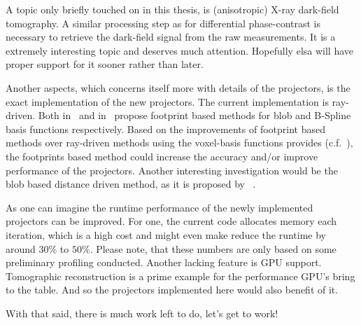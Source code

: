 A topic only briefly touched on in this thesis, is (anisotropic) X-ray dark-field tomography. A
similar processing step as for differential phase-contrast is necessary to retrieve the dark-field
signal from the raw measurements. It is a extremely interesting topic and deserves much attention.
Hopefully elsa will have proper support for it sooner rather than later.

Another aspects, which concerns itself more with details of the projectors, is the exact
implementation of the new projectors. The current implementation is ray-driven. Both
\citeauthor*{kohler_iterative_2011} in~\cite{kohler_iterative_2011} and
\citeauthor*{momey_spline_2015} in~\cite{momey_spline_2015} propose footprint based methods for blob
and B-Spline basis functions respectively. Based on the improvements of footprint based methods over
ray-driven methods using the voxel-basis functions provides (c.f.\ \cite{long_3d_2010}), the
footprints based method could increase the accuracy and/or improve performance of the projectors.
Another interesting investigation would be the blob based distance driven method, as it is proposed
by \citeauthor*{levakhina_distance-driven_2010}~\cite{levakhina_distance-driven_2010}.

As one can imagine the runtime performance of the newly implemented projectors can be improved. For
one, the current code allocates memory each iteration, which is a high cost and might even make
reduce the runtime by around \(30\%\) to \(50\%\). Please note, that these numbers are only based on
some preliminary profiling conducted. Another lacking feature is GPU support. Tomographic
reconstruction is a prime example for the performance GPU's bring to the table. And so the
projectors implemented here would also benefit of it.

\begin{flushright}
	With that said, there is much work left to do, let's get to work!
\end{flushright}

